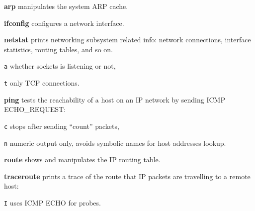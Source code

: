 \begin{compactenum}
\item [\cmdvar] \textbf{arp} manipulates the system ARP cache.
\item [\cmdvar] \textbf{ifconfig} configures a network interface.   
\item [\cmdvar] \textbf{netstat} prints networking subsystem related info: network connections, interface statistics, routing tables, and so on.
\item [\texttt{a}] whether sockets is listening or not,
\item [\texttt{t}] only TCP connections.
\item [\cmdvar] \textbf{ping} tests the reachability of a host 
on an IP network by sending ICMP ECHO\_REQUEST:
\item [\texttt{c}] stops after sending ``count'' packets,
\item [\texttt{n}] numeric output only, avoids symbolic names for host addresses lookup. 
\item [\cmdvar] \textbf{route} shows and manipulates the IP routing table.
\item [\cmdvar] \textbf{traceroute} prints a trace of the route that IP packets are travelling to a remote host:
\item [\texttt{I}] uses ICMP ECHO for probes.
\end{compactenum}




